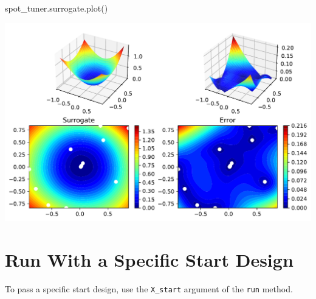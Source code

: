\documentclass[
  letterpaper,
  DIV=11,
  numbers=noendperiod]{scrreprt}
\newenvironment{Shaded}{\begin{snugshade}}{\end{snugshade}}
\newcommand{\NormalTok}[1]{\textcolor[rgb]{0.00,0.23,0.31}{#1}}
\begin{document}
\begin{Shaded}
\begin{Highlighting}[]
\NormalTok{spot\_tuner.surrogate.plot()}
\end{Highlighting}
\end{Shaded}

\includegraphics{a_04_spot_doc_files/figure-pdf/cell-12-output-1.pdf}

\section{Run With a Specific Start
Design}\label{run-with-a-specific-start-design}

To pass a specific start design, use the \texttt{X\_start} argument of
the \texttt{run} method.
\end{document}
